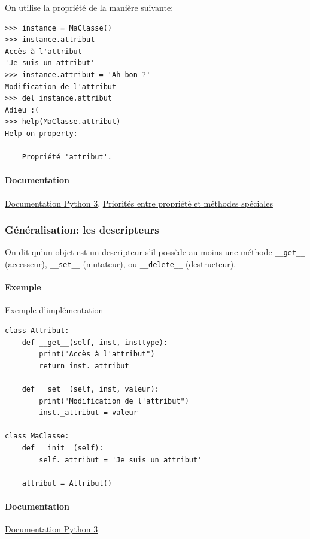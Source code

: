 \documentclass[a4paper, 10pt]{article}
\begin{document}
On utilise la propriété de la manière suivante:
\begin{Verbatim}[frame=single, fontsize=\footnotesize]
>>> instance = MaClasse()
>>> instance.attribut
Accès à l'attribut
'Je suis un attribut'
>>> instance.attribut = 'Ah bon ?'
Modification de l'attribut
>>> del instance.attribut
Adieu :(
>>> help(MaClasse.attribut)
Help on property:

    Propriété 'attribut'.

\end{Verbatim}

\paragraph{Documentation}\href{https://docs.python.org/fr/3/library/functions.html?highlight=property#property}{Documentation Python 3}, \href{https://stackoverflow.com/questions/15750522/class-properties-and-setattr/15751159#15751159}{Priorités entre propriété et méthodes spéciales}
\subsubsection{Généralisation: les descripteurs}
On dit qu'un objet est un descripteur s'il possède au moins une méthode \texttt{__get__} (accesseur), \texttt{__set__} (mutateur), ou \texttt{__delete__} (destructeur).

\paragraph{Exemple} Exemple d'implémentation
\begin{verbatim}
class Attribut:
    def __get__(self, inst, insttype):
        print("Accès à l'attribut")
        return inst._attribut

    def __set__(self, inst, valeur):
        print("Modification de l'attribut")
        inst._attribut = valeur

class MaClasse:
    def __init__(self):
        self._attribut = 'Je suis un attribut'

    attribut = Attribut()
\end{verbatim}

\paragraph{Documentation} \href{https://docs.python.org/3/howto/descriptor.html}{Documentation Python 3}
\end{document}
